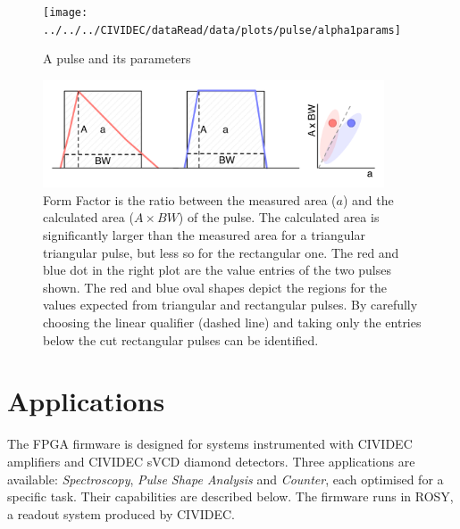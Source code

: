 \begin{figure}[!t]
\centering
\texttt{[image: ../../../CIVIDEC/dataRead/data/plots/pulse/alpha1params]}
\caption{A pulse and its parameters}
\label{fig:params}
\end{figure}


\begin{figure}[!t]
\centering
\includegraphics[width=0.9\textwidth]{05_current_monitoring/plots/formfac1}
\caption{Form Factor is the ratio between the measured area ($a$) and the calculated area ($A\times BW$) of the pulse. The calculated area is significantly larger than the measured area for a triangular triangular pulse, but less so for the rectangular one. The red and blue dot in the right plot are the value entries of the two pulses shown. The red and blue oval shapes depict the regions for the values expected from triangular and rectangular pulses. By carefully choosing the linear qualifier (dashed line) and taking only the entries below the cut rectangular pulses can be identified.}
\label{fig:formfac1}
\end{figure}



\section{Applications}
\label{sec:applications}

The FPGA firmware is designed for systems instrumented with CIVIDEC amplifiers and CIVIDEC sVCD diamond detectors. Three applications are available: \emph{Spectroscopy}, \emph{Pulse Shape Analysis} and \emph{Counter}, each optimised for a specific task. Their capabilities are described below. The firmware runs in ROSY, a readout system produced by CIVIDEC.

